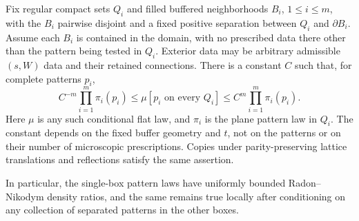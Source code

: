\begin{proposition}
\label{prop:pattern-comparison}
Fix regular compact sets $Q_i$ and filled buffered neighborhoods
$B_i$, $1\le i\le m$, with the $B_i$ pairwise disjoint and a fixed
positive separation between $Q_i$ and $\partial B_i$. Assume each
$B_i$ is contained in the domain, with no prescribed data there
other than the pattern being tested in $Q_i$. Exterior data may be
arbitrary admissible $(s,W)$ data and their retained connections.
There is a constant $C$ such that, for complete patterns $p_i$,
\begin{equation}\label{eq:spatial-product-patterns}
 C^{-m}\prod_{i=1}^m\pi_i(p_i)
 \le \mu[p_i\text{ on every }Q_i]
 \le C^m\prod_{i=1}^m\pi_i(p_i).
\end{equation}
Here $\mu$ is any such conditional flat law, and $\pi_i$ is the
plane pattern law in $Q_i$. The constant depends on the fixed
buffer geometry and $t$, not on the patterns or on their number
of microscopic prescriptions. Copies under parity-preserving lattice
translations and reflections satisfy the same assertion.

In particular, the single-box pattern laws have uniformly bounded
Radon--Nikodym density ratios, and the same remains true locally
after conditioning on any collection of separated patterns in the
other boxes.
\end{proposition}

